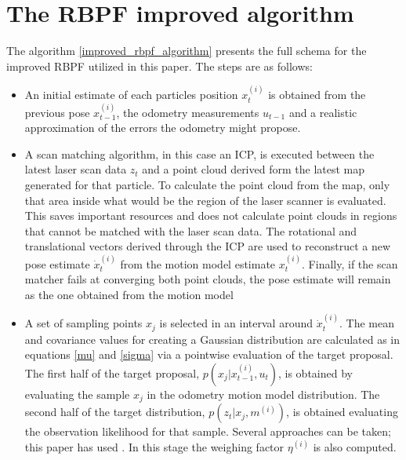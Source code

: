 \documentclass[letterpaper]{article}
\begin{document}
\section{The RBPF improved algorithm}
The algorithm \ref{improved_rbpf_algorithm} presents the full schema for the improved RBPF utilized in this paper. The steps are as follows:
\begin{itemize}
	\item An initial estimate of each particles position $x_t^{(i)}$ is obtained from the previous pose $x_{t-1}^{(i)}$, the odometry measurements $u_{t-1}$ and a realistic approximation of the errors the odometry might propose.
	\item A scan matching algorithm, in this case an ICP, is executed between the latest laser scan data $z_t$ and a point cloud derived form the latest map generated for that particle. To calculate the point cloud from the map, only that area inside what would be the region of the laser scanner is evaluated. This saves important resources and does not calculate point clouds in regions that cannot be matched with the laser scan data. The rotational and translational vectors derived through the ICP are used to reconstruct a new pose estimate $\dot x_t^{(i)}$ from the motion model estimate $x_t^{(i)}$. Finally, if the scan matcher fails at converging both point clouds, the pose estimate will remain as the one obtained from the motion model
	\item A set of sampling points $x_j$ is selected in an interval around $\dot x_t^{(i)}$. The mean and covariance values for creating a Gaussian distribution are calculated as in equations \ref{mu} and \ref{sigma} via a pointwise evaluation of the target proposal. The first half of the target proposal,  $p(x_j|x_{t-1}^{(i)}, u_t)$, is obtained by evaluating the sample $x_j$ in the odometry motion model distribution. The second half of the target distribution, $p(z_t|x_j, m^{(i)})$, is obtained evaluating the observation likelihood for that sample. Several approaches can be taken; this paper has used . In this stage the weighing factor $\eta^{(i)}$ is also computed. 
\end{itemize}











\end{document}
